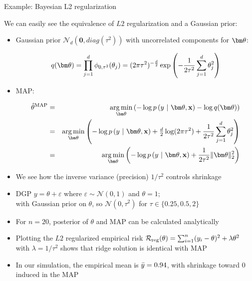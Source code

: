 \documentclass[11pt,compress,t,notes=noshow, xcolor=table]{beamer}
\begin{document}
\begin{vbframe}{Example: Bayesian L2 regularization}

\small We can easily see the equivalence of $L2$ regularization and a Gaussian 
prior:

\begin{itemize}
  \small
  \item Gaussian prior $\mathcal{N}_d(\bm{0}, \mathit{diag}(\tau^2))$ with uncorrelated components for $\thetav$:
  \begin{footnotesize}
    $$q(\thetav) = \prod_{j = 1}^d  \phi_{0,\tau^2}(\theta_j) 
    = (2\pi\tau^2)^{-\frac{d}{2}} \exp \left( - \frac{1}{2\tau^2} \sum_{j = 1}^d 
    \theta_j^2 \right)$$
  \end{footnotesize} 
  \item MAP:
  \begin{footnotesize}
  \begin{eqnarray*}
    \thetah^{\text{MAP}} &=& \argmin_{\thetav} \left(
    - \log p\left(y ~|~ \thetav, \xv \right) - \log q(\thetav)
    \right) \\
    &=& \argmin_{\thetav} \left(
    - \log p\left(y ~|~ \thetav, \xv \right) + \tfrac{d}{2} \log(2\pi \tau^2) +
    \frac{1}{2\tau^2} \sum_{j = 1}^d \theta_j^2
    \right) \\
    &=& \argmin_{\thetav} \left(
    - \log p\left(y ~|~ \thetav, \xv \right) + \frac{1}{2\tau^2} \| \thetav \|_2^2
    \right)
  \end{eqnarray*}
  \end{footnotesize} 
  \item We see how the inverse variance (precision) $1/\tau^2$ controls shrinkage
\end{itemize}

\framebreak

\begin{itemize}
    \item DGP $y = \theta + \varepsilon$ where $\varepsilon \sim \mathcal{N}(0,1)$ and $\theta=1$;\\
    with Gaussian prior on $\theta$, so $\mathcal{N}(0, \tau^2)$ for $\tau \in \{0.25, 0.5, 2\}$
    \item For $n=20$, posterior of $\theta$ and MAP can be calculated analytically
    \item Plotting the $L2$ regularized empirical risk $\mathcal{R}_{\text{reg}}(\theta) = \sum_{i=1}^{n} (y_i-\theta)^2+\lambda \theta^2$ with $\lambda = 1/\tau^2$ shows that ridge solution is identical with MAP
    \item In our simulation, the empirical mean is $\Bar{y}=0.94$, with shrinkage toward $0$ induced in the MAP
\end{itemize}


\end{vbframe}
\end{document}

